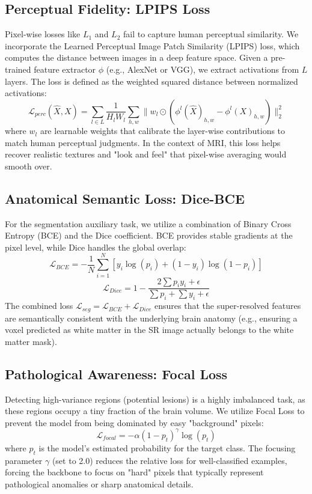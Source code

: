 \documentclass{IEEEoj}
\begin{document}
\subsection{Perceptual Fidelity: LPIPS Loss}
Pixel-wise losses like $L_1$ and $L_2$ fail to capture human perceptual similarity. We incorporate the Learned Perceptual Image Patch Similarity (LPIPS) \cite{lpips} loss, which computes the distance between images in a deep feature space. Given a pre-trained feature extractor $\phi$ (e.g., AlexNet or VGG), we extract activations from $L$ layers. The loss is defined as the weighted squared distance between normalized activations:
\begin{equation}
    \mathcal{L}_{perc}(\hat{X}, X) = \sum_{l \in L} \frac{1}{H_l W_l} \sum_{h,w} \| w_l \odot (\phi^l(\hat{X})_{h,w} - \phi^l(X)_{h,w}) \|_2^2
\end{equation}
where $w_l$ are learnable weights that calibrate the layer-wise contributions to match human perceptual judgments. In the context of MRI, this loss helps recover realistic textures and "look and feel" that pixel-wise averaging would smooth over.

\subsection{Anatomical Semantic Loss: Dice-BCE}
For the segmentation auxiliary task, we utilize a combination of Binary Cross Entropy (BCE) and the Dice coefficient. BCE provides stable gradients at the pixel level, while Dice handles the global overlap:
\begin{equation}
    \mathcal{L}_{BCE} = -\frac{1}{N} \sum_{i=1}^N [y_i \log(p_i) + (1-y_i) \log(1-p_i)]
\end{equation}
\begin{equation}
    \mathcal{L}_{Dice} = 1 - \frac{2 \sum p_i y_i + \epsilon}{\sum p_i + \sum y_i + \epsilon}
\end{equation}
The combined loss $\mathcal{L}_{seg} = \mathcal{L}_{BCE} + \mathcal{L}_{Dice}$ ensures that the super-resolved features are semantically consistent with the underlying brain anatomy (e.g., ensuring a voxel predicted as white matter in the SR image actually belongs to the white matter mask).

\subsection{Pathological Awareness: Focal Loss}
Detecting high-variance regions (potential lesions) is a highly imbalanced task, as these regions occupy a tiny fraction of the brain volume. We utilize Focal Loss to prevent the model from being dominated by easy "background" pixels:
\begin{equation}
    \mathcal{L}_{focal} = -\alpha (1 - p_t)^\gamma \log(p_t)
\end{equation}
where $p_t$ is the model's estimated probability for the target class. The focusing parameter $\gamma$ (set to 2.0) reduces the relative loss for well-classified examples, forcing the backbone to focus on "hard" pixels that typically represent pathological anomalies or sharp anatomical details.
\end{document}
